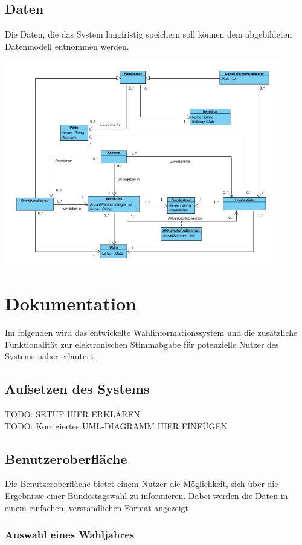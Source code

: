 \documentclass[a4paper]{scrreprt}
\begin{document}
\section{Daten}
Die Daten, die das System langfristig speichern soll können dem abgebildeten Datenmodell entnommen werden.

\includegraphics[width=0.9\textwidth]{images/Aufgabe3.png}


\chapter{Dokumentation}

Im folgenden wird das entwickelte Wahlinformationssystem und die zusätzliche Funktionalität zur elektronischen Stimmabgabe für potenzielle Nutzer des Systems näher erläutert.

\section{Aufsetzen des Systems}

TODO: SETUP HIER ERKLÄREN \\
TODO: Korrigiertes UML-DIAGRAMM HIER EINFÜGEN

\section{Benutzeroberfläche}

Die Benutzeroberfläche bietet einem Nutzer die Möglichkeit, sich über die Ergebnisse einer Bundestagswahl zu informieren. Dabei werden die Daten in einem einfachen, verständlichen Format angezeigt

\subsection{Auswahl eines Wahljahres}
\end{document}
